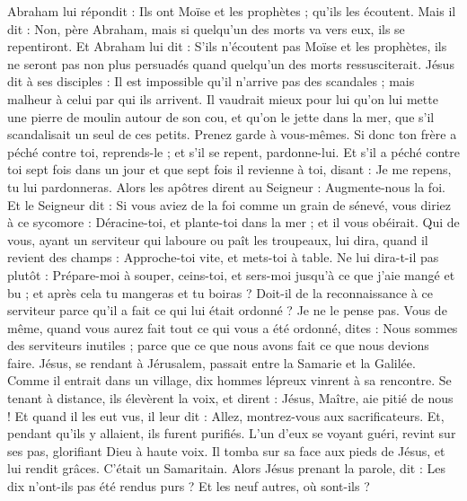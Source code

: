 \begin{multicols}{2}
Abraham lui répondit : Ils ont Moïse et les prophètes ; qu'ils les écoutent.
Mais il dit : Non, père Abraham, mais si quelqu'un des morts va vers eux, ils se repentiront.
Et Abraham lui dit : S'ils n'écoutent pas Moïse et les prophètes, ils ne seront pas non plus persuadés quand quelqu'un des morts ressusciterait.
\VerseOne{}Jésus dit à ses disciples : Il est impossible qu'il n'arrive pas des scandales ; mais malheur à celui par qui ils arrivent.
Il vaudrait mieux pour lui qu'on lui mette une pierre de moulin autour de son cou, et qu'on le jette dans la mer, que s'il scandalisait un seul de ces petits.
Prenez garde à vous-mêmes. Si donc ton frère a péché contre toi, reprends-le ; et s'il se repent, pardonne-lui.
Et s'il a péché contre toi sept fois dans un jour et que sept fois il revienne à toi, disant : Je me repens, tu lui pardonneras.
Alors les apôtres dirent au Seigneur : Augmente-nous la foi.
Et le Seigneur dit : Si vous aviez de la foi comme un grain de sénevé, vous diriez à ce sycomore : Déracine-toi, et plante-toi dans la mer ; et il vous obéirait.
Qui de vous, ayant un serviteur qui laboure ou paît les troupeaux, lui dira, quand il revient des champs : Approche-toi vite, et mets-toi à table.
Ne lui dira-t-il pas plutôt : Prépare-moi à souper, ceins-toi, et sers-moi jusqu'à ce que j'aie mangé et bu ; et après cela tu mangeras et tu boiras ?
Doit-il de la reconnaissance à ce serviteur parce qu'il a fait ce qui lui était ordonné ? Je ne le pense pas.
Vous de même, quand vous aurez fait tout ce qui vous a été ordonné, dites : Nous sommes des serviteurs inutiles ; parce que ce que nous avons fait ce que nous devions faire.
Jésus, se rendant à Jérusalem, passait entre la Samarie et la Galilée.
Comme il entrait dans un village, dix hommes lépreux vinrent à sa rencontre. Se tenant à distance, ils élevèrent la voix, et dirent :
Jésus, Maître, aie pitié de nous !
Et quand il les eut vus, il leur dit : Allez, montrez-vous aux sacrificateurs. Et, pendant qu'ils y allaient, ils furent purifiés.
L'un d'eux se voyant guéri, revint sur ses pas, glorifiant Dieu à haute voix.
Il tomba sur sa face aux pieds de Jésus, et lui rendit grâces. C'était un Samaritain.
Alors Jésus prenant la parole, dit : Les dix n'ont-ils pas été rendus purs ? Et les neuf autres, où sont-ils ?

\end{multicols}
